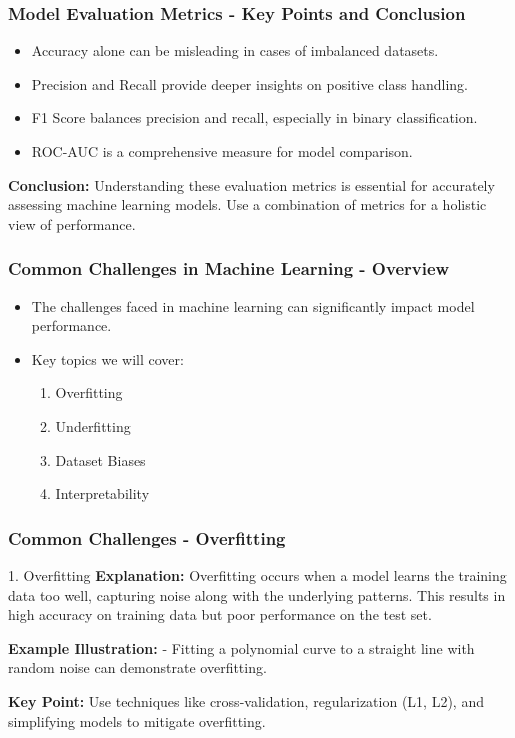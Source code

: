 \documentclass{beamer}
\begin{document}
\begin{frame}[fragile]
    \frametitle{Model Evaluation Metrics - Key Points and Conclusion}
    \begin{itemize}
        \item Accuracy alone can be misleading in cases of imbalanced datasets.
        \item Precision and Recall provide deeper insights on positive class handling.
        \item F1 Score balances precision and recall, especially in binary classification.
        \item ROC-AUC is a comprehensive measure for model comparison.
    \end{itemize}
    \textbf{Conclusion:} Understanding these evaluation metrics is essential for accurately assessing machine learning models. Use a combination of metrics for a holistic view of performance.
\end{frame}

\begin{frame}[fragile]
    \frametitle{Common Challenges in Machine Learning - Overview}
    \begin{itemize}
        \item The challenges faced in machine learning can significantly impact model performance.
        \item Key topics we will cover:
        \begin{enumerate}
            \item Overfitting
            \item Underfitting
            \item Dataset Biases
            \item Interpretability
        \end{enumerate}
    \end{itemize}
\end{frame}

\begin{frame}[fragile]
    \frametitle{Common Challenges - Overfitting}
    \begin{block}{1. Overfitting}
        \textbf{Explanation:}  
        Overfitting occurs when a model learns the training data too well, capturing noise along with the underlying patterns. This results in high accuracy on training data but poor performance on the test set.
    \end{block}

    \textbf{Example Illustration:}  
    - Fitting a polynomial curve to a straight line with random noise can demonstrate overfitting.

    \textbf{Key Point:}  
    Use techniques like cross-validation, regularization (L1, L2), and simplifying models to mitigate overfitting.
\end{frame}
\end{document}
